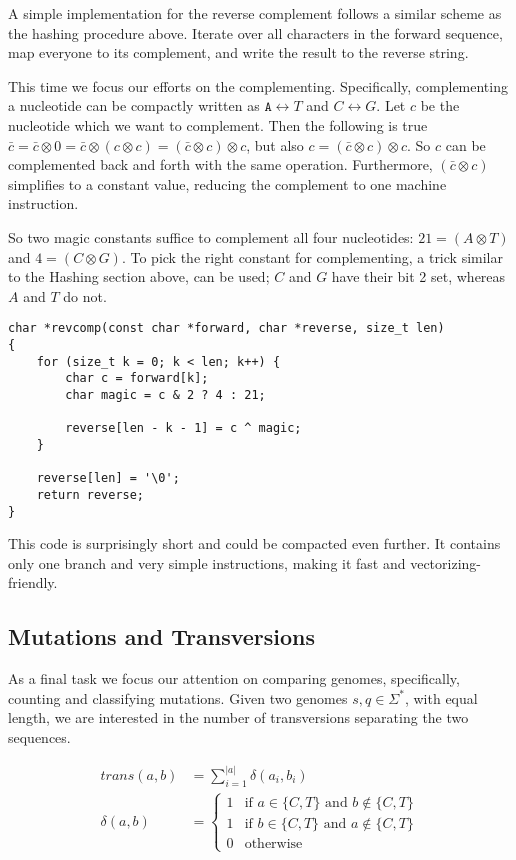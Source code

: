\documentclass[10pt,letterpaper]{article}
\begin{document}
A simple implementation for the reverse complement follows a similar scheme as the hashing procedure above. Iterate over all characters in the forward sequence, map everyone to its complement, and write the result to the reverse string.

This time we focus our efforts on the complementing. Specifically, complementing a nucleotide can be compactly written as $\texttt{A} \leftrightarrow T$ and $C \leftrightarrow G$. Let $c$ be the nucleotide which we want to complement. Then the following is true $\bar c = \bar c \otimes 0 = \bar c \otimes (c \otimes c) = (\bar c \otimes c) \otimes c$, but also $c = (\bar c \otimes c) \otimes c$. So $c$ can be complemented back and forth with the same operation. Furthermore, $(\bar c \otimes c)$ simplifies to a constant value, reducing the complement to one machine instruction.

So two magic constants suffice to complement all four nucleotides: $21 = (A \otimes T)$ and $4 = (C \otimes G)$. To pick the right constant for complementing, a trick similar to the Hashing section above, can be used; $C$ and $G$ have their bit 2 set, whereas $A$ and $T$ do not.


\begin{lstlisting}
char *revcomp(const char *forward, char *reverse, size_t len)
{
	for (size_t k = 0; k < len; k++) {
		char c = forward[k];
		char magic = c & 2 ? 4 : 21;

		reverse[len - k - 1] = c ^ magic;
	}

	reverse[len] = '\0';
	return reverse;
}
\end{lstlisting}

This code is surprisingly short and could be compacted even further. It contains only one branch and very simple instructions, making it fast and vectorizing-friendly.


\subsection{Mutations and Transversions}
\label{sec:transversions}

As a final task we focus our attention on comparing genomes, specifically, counting and classifying mutations. Given two genomes $s,q \in \Sigma^*$, with equal length, we are interested in the number of transversions separating the two sequences.

\begin{align*}
    \mathit{trans}(a,b) &= \sum_{i=1}^{|a|} \delta(a_i,b_i) \\
    \delta(a,b) &= \begin{cases}
        1 & \text{if } a \in \{C,T\} \text{ and } b \not\in \{C,T\} \\
        1 & \text{if } b \in \{C,T\} \text{ and } a \not\in \{C,T\} \\
        0 & \text{otherwise}
    \end{cases}
\end{align*}
\end{document}
